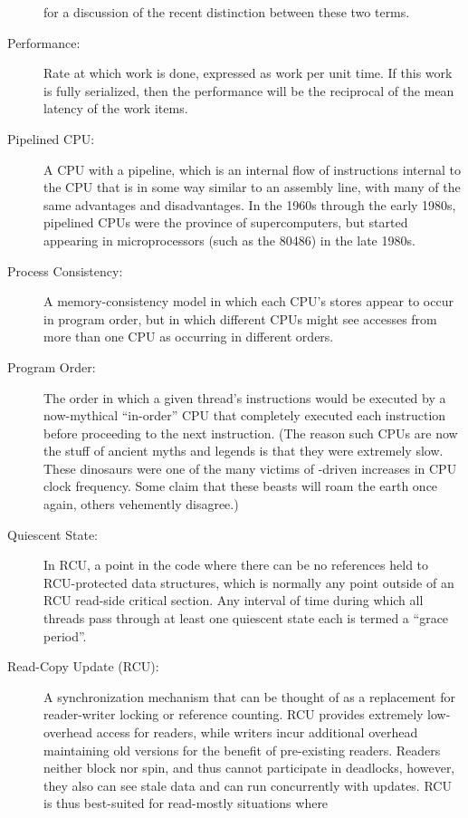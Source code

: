 \begin{description}
	for a discussion of the recent distinction between these two
	terms.
\item[Performance:]
	Rate at which work is done, expressed as work per unit time.
	If this work is fully serialized, then the performance will
	be the reciprocal of the mean latency of the work items.
\item[Pipelined CPU:]
	A CPU with a pipeline, which is
	an internal flow of instructions internal to the CPU that
	is in some way similar to an assembly line, with many of
	the same advantages and disadvantages.
	In the 1960s through the early 1980s, pipelined CPUs were the
	province of supercomputers, but started appearing in microprocessors
	(such as the 80486) in the late 1980s.
\item[Process Consistency:]
	A memory-consistency model in which each CPU's stores appear to
	occur in program order, but in which different CPUs might see
	accesses from more than one CPU as occurring in different orders.
\item[Program Order:]
	The order in which a given thread's instructions
	would be executed by a now-mythical ``in-order'' CPU that
	completely executed each instruction before proceeding to
	the next instruction.
	(The reason such CPUs are now the stuff of ancient myths
	and legends is that they were extremely slow.
	These dinosaurs were one of the many victims of
	-driven increases in CPU clock frequency.
	Some claim that these beasts will roam the earth once again,
	others vehemently disagree.)
\item[Quiescent State:]
	In RCU, a point in the code where there can be no references held
	to RCU-protected data structures, which is normally any point
	outside of an RCU read-side critical section.
	Any interval of time during which all threads pass through at
	least one quiescent state each is termed a ``grace period''.
\item[Read-Copy Update (RCU):]
	A synchronization mechanism that can be thought of as a replacement
	for reader-writer locking or reference counting.
	RCU provides extremely low-overhead access for readers, while
	writers incur additional overhead maintaining old versions
	for the benefit of pre-existing readers.
	Readers neither block nor spin, and thus cannot participate in
	deadlocks, however, they also can see stale data and can
	run concurrently with updates.
	RCU is thus best-suited for read-mostly situations where

\end{description}
